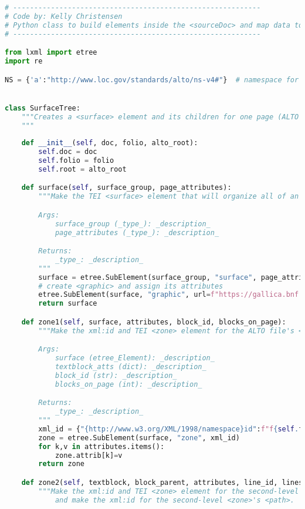 \documentclass[class=article, crop=false]{standalone}
\begin{document}
\begin{lstlisting}[language=python, style=python]
# -----------------------------------------------------------
# Code by: Kelly Christensen
# Python class to build elements inside the <sourceDoc> and map data to them.
# -----------------------------------------------------------

from lxml import etree
import re

NS = {'a':"http://www.loc.gov/standards/alto/ns-v4#"}  # namespace for the Alto xml


class SurfaceTree:
    """Creates a <surface> element and its children for one page (ALTO file) of a document.
    """    
    
    def __init__(self, doc, folio, alto_root):
        self.doc = doc
        self.folio = folio
        self.root = alto_root

    def surface(self, surface_group, page_attributes):
        """Make the TEI <surface> element that will organize all of an ALTO file's data.

        Args:
            surface_group (_type_): _description_
            page_attributes (_type_): _description_

        Returns:
            _type_: _description_
        """        
        surface = etree.SubElement(surface_group, "surface", page_attributes)
        # create <graphic> and assign its attributes
        etree.SubElement(surface, "graphic", url=f"https://gallica.bnf.fr/iiif/ark:/12148/{self.doc}/f{self.folio}/full/full/0/native.jpg")
        return surface

    def zone1(self, surface, attributes, block_id, blocks_on_page):
        """Make the xml:id and TEI <zone> element for the ALTO file's <TextBlock>.

        Args:
            surface (etree_Element): _description_
            textblock_atts (dict): _description_
            block_id (str): _description_
            blocks_on_page (int): _description_

        Returns:
            _type_: _description_
        """        
        xml_id = {"{http://www.w3.org/XML/1998/namespace}id":f"f{self.folio}-{block_id}-blockCount{blocks_on_page}"}
        zone = etree.SubElement(surface, "zone", xml_id)
        for k,v in attributes.items():
            zone.attrib[k]=v
        return zone

    def zone2(self, textblock, block_parent, attributes, line_id, lines_on_page):   
        """Make the xml:id and TEI <zone> element for the second-level <zone> for the ALTO file's <TextLine>
            and make the xml:id for the second-level <zone>'s <path>.


\end{lstlisting}
\end{document}
